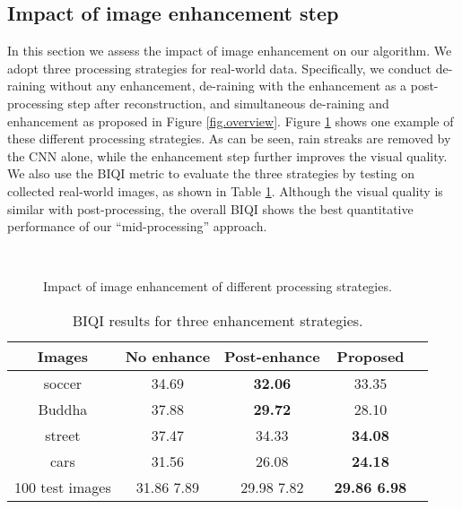 \documentclass[journal]{IEEEtran}
\begin{document}
\subsection{Impact of image enhancement step}
In this section we assess the impact of image enhancement on our algorithm. We adopt three processing strategies for real-world data. Specifically, we conduct de-raining without any enhancement, de-raining with the enhancement as a post-processing step after reconstruction, and simultaneous de-raining and enhancement as proposed in Figure \ref{fig.overview}. Figure \ref{fig.enhance_step} shows one example of these different processing strategies. As can be seen, rain streaks are removed by the CNN alone, while the enhancement step further improves the visual quality. We also use the BIQI metric to evaluate the three strategies by testing on collected real-world images, as shown in Table \ref{tab.NIQE1}. Although the visual quality is similar with post-processing, the overall BIQI shows the best quantitative performance of our ``mid-processing'' approach.
 \begin{figure}[h!]
\centering
{}
\\
\caption{Impact of image enhancement of different processing strategies.} \label{fig.enhance_step}
\end{figure}


\begin{table}[h]
\caption{BIQI results for three enhancement strategies.}
\label{tab.NIQE1}
\centering
\begin{tabular}{|c|c|c|c|c|}
\hline
Images  & No enhance & Post-enhance & Proposed \\
\hline
soccer& 34.69 & \textbf{32.06}    &33.35\\
\hline
Buddha& 37.88&\textbf{29.72}   &28.10\\
\hline
street& 37.47  & 34.33 &\textbf{34.08}\\
\hline
cars & 31.56 &  26.08 &\textbf{24.18}\\
\hline
100 test images& 31.86  7.89   &  29.98  7.82  &\textbf{29.86  6.98}\\
\hline
\end{tabular}
\end{table}
\end{document}
